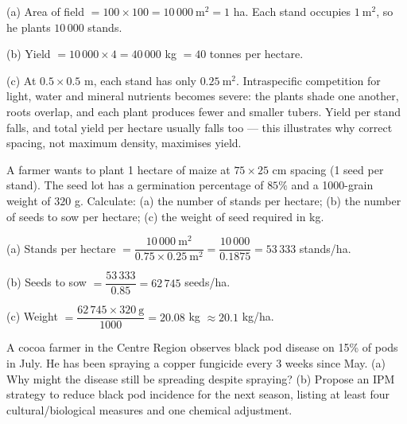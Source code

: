 \documentclass[11pt]{article}
\begin{document}
\begin{corrige}[Exercise 1]
(a) Area of field $= 100 \times 100 = 10\,000\ \mathrm{m^2} = 1$ ha. Each stand occupies $1\ \mathrm{m^2}$, so he plants $10\,000$ stands.

(b) Yield $= 10\,000 \times 4 = 40\,000$ kg $= 40$ tonnes per hectare.

(c) At $0.5 \times 0.5$ m, each stand has only $0.25\ \mathrm{m^2}$. Intraspecific competition for light, water and mineral nutrients becomes severe: the plants shade one another, roots overlap, and each plant produces fewer and smaller tubers. Yield per stand falls, and total yield per hectare usually falls too — this illustrates why correct spacing, not maximum density, maximises yield.
\end{corrige}

\begin{exercice}
A farmer wants to plant 1 hectare of maize at $75 \times 25$ cm spacing (1 seed per stand). The seed lot has a germination percentage of $85\%$ and a 1000-grain weight of $320$ g. Calculate: (a) the number of stands per hectare; (b) the number of seeds to sow per hectare; (c) the weight of seed required in kg.
\end{exercice}

\begin{corrige}[Exercise 2]
(a) Stands per hectare $= \dfrac{10\,000\ \mathrm{m^2}}{0.75 \times 0.25\ \mathrm{m^2}} = \dfrac{10\,000}{0.1875} = 53\,333$ stands/ha.

(b) Seeds to sow $= \dfrac{53\,333}{0.85} = 62\,745$ seeds/ha.

(c) Weight $= \dfrac{62\,745 \times 320\ \mathrm{g}}{1000} = 20.08$ kg $\approx 20.1$ kg/ha.
\end{corrige}

\begin{exercice}
A cocoa farmer in the Centre Region observes black pod disease on 15\% of pods in July. He has been spraying a copper fungicide every 3 weeks since May. (a) Why might the disease still be spreading despite spraying? (b) Propose an IPM strategy to reduce black pod incidence for the next season, listing at least four cultural/biological measures and one chemical adjustment.
\end{exercice}
\end{document}
